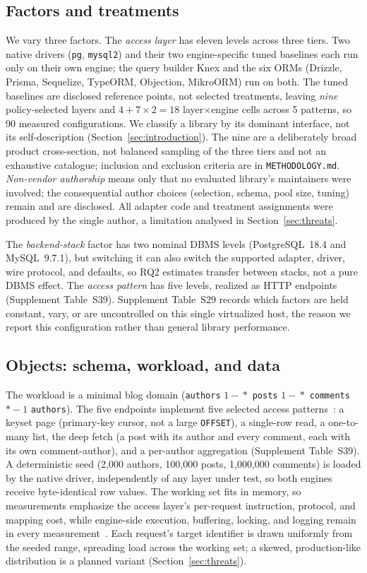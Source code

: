 \subsection{Factors and treatments}
We vary three factors.
The \emph{access layer} has eleven levels across three tiers.
Two native drivers (\texttt{pg}, \texttt{mysql2}) and their two engine-specific tuned baselines each run only on their own engine; the query builder Knex and the six ORMs (Drizzle, Prisma, Sequelize, TypeORM, Objection, MikroORM) run on both.
The tuned baselines are disclosed reference points, not selected treatments, leaving \emph{nine} policy-selected layers and $4 + 7\times 2 = 18$ layer$\times$engine cells across 5 patterns, so 90 measured configurations.
We classify a library by its dominant interface, not its self-description (Section~\ref{sec:introduction}).
The nine are a deliberately broad product cross-section, not balanced sampling of the three tiers and not an exhaustive catalogue; inclusion and exclusion criteria are in \texttt{METHODOLOGY.md}.
\emph{Non-vendor authorship} means only that no evaluated library's maintainers were involved; the consequential author choices (selection, schema, pool size, tuning) remain and are disclosed.
All adapter code and treatment assignments were produced by the single author, a limitation analysed in Section~\ref{sec:threats}.

The \emph{backend-stack} factor has two nominal DBMS levels (PostgreSQL~18.4 and MySQL~9.7.1), but switching it can also switch the supported adapter, driver, wire protocol, and defaults, so RQ2 estimates transfer between stacks, not a pure DBMS effect.
The \emph{access pattern} has five levels, realized as HTTP endpoints (Supplement Table~S39).
Supplement Table~S29 records which factors are held constant, vary, or are uncontrolled on this single virtualized host, the reason we report this configuration rather than general library performance.

\subsection{Objects: schema, workload, and data}
The workload is a minimal blog domain (\texttt{authors} $1\!-\!*$ \texttt{posts} $1\!-\!*$ \texttt{comments} $*\!-\!1$ \texttt{authors}).
The five endpoints implement five selected access patterns~\cite{cooper2010ycsb}: a keyset page (primary-key cursor, not a large \texttt{OFFSET}), a single-row read, a one-to-many list, the deep fetch (a post with its author and every comment, each with its own comment-author), and a per-author aggregation (Supplement Table~S39).
A deterministic seed (2{,}000 authors, 100{,}000 posts, 1{,}000{,}000 comments) is loaded by the native driver, independently of any layer under test, so both engines receive byte-identical row values.
The working set fits in memory, so measurements emphasize the access layer's per-request instruction, protocol, and mapping cost, while engine-side execution, buffering, locking, and logging remain in every measurement~\cite{harizopoulos2008oltp}.
Each request's target identifier is drawn uniformly from the seeded range, spreading load across the working set; a skewed, production-like distribution is a planned variant (Section~\ref{sec:threats}).

